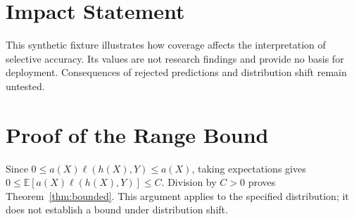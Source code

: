 \documentclass{article}\usepackage{microtype,graphicx,booktabs,hyperref}
\begin{document}
\printAffiliationsAndNotice{}
\begin{abstract}
We examine a fixed confidence gate for selective classification using a synthetic
evaluation fixture. The gate abstains from predictions below a specified confidence
threshold. We report accuracy among accepted predictions alongside coverage on two
synthetic datasets. Conditional accuracy increases on one dataset and decreases on
the other; these observations do not establish an overall accuracy improvement.
A range bound for selective risk requires positive coverage and bounded loss.
Statistical uncertainty, runtime, and distribution shift remain unevaluated.
\end{abstract}

\section*{Impact Statement}
This synthetic fixture illustrates how coverage affects the interpretation of selective accuracy. Its values are not research findings and provide no basis for deployment. Consequences of rejected predictions and distribution shift remain untested.

\clearpage
\appendix
\section{Proof of the Range Bound}\label{app:proof}
Since $0\leq a(X)\ell(h(X),Y)\leq a(X)$, taking expectations gives
$0\leq\mathbb{E}[a(X)\ell(h(X),Y)]\leq C$. Division by $C>0$ proves
Theorem~\ref{thm:bounded}. This argument applies to the specified distribution;
it does not establish a bound under distribution shift.
\end{document}
